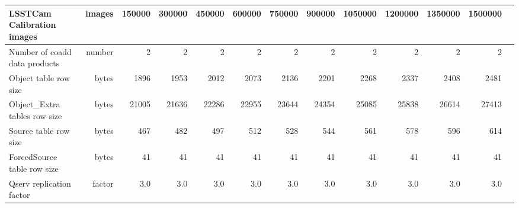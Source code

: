 \begin{longtable} { |p{}  |r  |r  |r  |r  |r  |r  |r  |r  |r  |r  |r  |r |}
{LSSTCam Calibration images}&{images}&{150000}&{300000}&{450000}&{600000}&{750000}&{900000}&{1050000}&{1200000}&{1350000}&{1500000} \\ \hline
{Number of coadd data products}&{number}&{2}&{2}&{2}&{2}&{2}&{2}&{2}&{2}&{2}&{2} \\ \hline
{Object table row size}&{bytes}&{1896}&{1953}&{2012}&{2073}&{2136}&{2201}&{2268}&{2337}&{2408}&{2481} \\ \hline
{Object\_Extra tables row size}&{bytes}&{21005}&{21636}&{22286}&{22955}&{23644}&{24354}&{25085}&{25838}&{26614}&{27413} \\ \hline
{Source table row size}&{bytes}&{467}&{482}&{497}&{512}&{528}&{544}&{561}&{578}&{596}&{614} \\ \hline
{ForcedSource table row size}&{bytes}&{41}&{41}&{41}&{41}&{41}&{41}&{41}&{41}&{41}&{41} \\ \hline
{Qserv replication factor}&{factor}&{3.0}&{3.0}&{3.0}&{3.0}&{3.0}&{3.0}&{3.0}&{3.0}&{3.0}&{3.0} \\ \hline
\end{longtable} \normalsize
